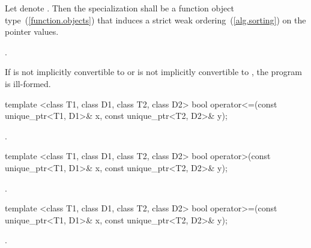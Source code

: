 \begin{itemdescr}
\pnum
\requires Let  denote . Then the specialization
 shall be a function object type~(\ref{function.objects}) that
induces a strict weak ordering~(\ref{alg.sorting}) on the pointer values.

\pnum
\returns {}.

\pnum
\remarks If  is not implicitly convertible
to  or  is not implicitly
convertible to , the program is ill-formed.
\end{itemdescr}

%
%
\begin{itemdecl}
template <class T1, class D1, class T2, class D2>
  bool operator<=(const unique_ptr<T1, D1>& x, const unique_ptr<T2, D2>& y);
\end{itemdecl}

\begin{itemdescr}
\pnum
\returns {}.
\end{itemdescr}

%
%
\begin{itemdecl}
template <class T1, class D1, class T2, class D2>
  bool operator>(const unique_ptr<T1, D1>& x, const unique_ptr<T2, D2>& y);
\end{itemdecl}

\begin{itemdescr}
\pnum
\returns {}.
\end{itemdescr}

%
%
\begin{itemdecl}
template <class T1, class D1, class T2, class D2>
  bool operator>=(const unique_ptr<T1, D1>& x, const unique_ptr<T2, D2>& y);
\end{itemdecl}

\begin{itemdescr}
\pnum
\returns {}.
\end{itemdescr}

